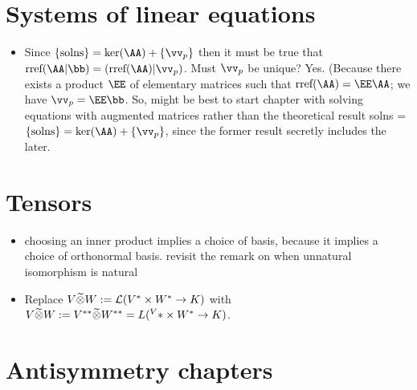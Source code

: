 \section*{Systems of linear equations}

\begin{itemize}
    \item Since $\{\text{solns}\} = \ker(\AA) + \{\vv_p\}$ then it must be true that $\rref(\AA | \bb) = (\rref(\AA) | \vv_p)$. Must $\vv_p$ be unique? Yes. (Because there exists a product $\EE$ of elementary matrices such that $\rref(\AA) = \EE \AA$; we have $\vv_p = \EE \bb$. So, might be best to start chapter with solving equations with augmented matrices rather than the theoretical result solns = $\{\text{solns}\} = \ker(\AA) + \{\vv_p\}$, since the former result secretly includes the later.
\end{itemize}

\section*{Tensors}

\begin{itemize}
    \item choosing an inner product implies a choice of basis, because it implies a choice of orthonormal basis. revisit the remark on when unnatural isomorphism is natural
    \item Replace $V \widetilde{\otimes} W := \mathcal{L}(V^* \times W^* \rightarrow K)$ with $V \widetilde{\otimes} W := V^{**} \widetilde{\otimes} W^{**} = L(^V* \times W^* \rightarrow K)$.
\end{itemize}

\section*{Antisymmetry chapters}

